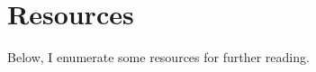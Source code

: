 \newpage 
\section*{Resources} 

Below, I enumerate some resources for further reading. 

\begin{outline}

\end{outline}
